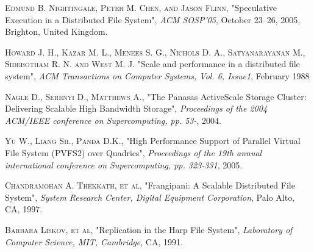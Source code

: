 \documentclass[a4paper,12pt]{article}
\begin{document}
\begin{thebibliography}{99}
  \textsc{Edmund B. Nightingale, Peter M. Chen, and Jason
Flinn},
  "Speculative Execution in a Distributed File System",
  \emph{ACM SOSP’05},
  October 23–26, 2005, Brighton, United Kingdom.

  \textsc{Howard J. H., Kazar M. L., Menees S. G., Nichols D. A.,
Satyanarayanan M., Sidebotham R. N. and West M. J.}
  "Scale and performance in a distributed file system",
  \emph{ACM Transactions on Computer Systems, Vol. 6, Issue1},
  February 1988

  \textsc{Nagle D., Serenyi D., Matthews A.},
  "The Panasas ActiveScale Storage Cluster: Delivering Scalable High Bandwidth Storage",
  \emph{Proceedings of the 2004 ACM/IEEE conference on Supercomputing, pp. 53-},
  2004.

  \textsc{Yu W., Liang Sh., Panda D.K.},
  "High Performance Support of Parallel Virtual File System (PVFS2) over Quadrics",
  \emph{Proceedings of the 19th annual international conference on Supercomputing, pp. 323-331},
  2005.

  \textsc{Chandramohan A. Thekkath, et al},
  "Frangipani: A Scalable Distributed File System",
  \emph{System Research Center, Digital Equipment Corporation},
  Palo Alto, CA, 1997.

  \textsc{Barbara Liskov, et al},
  "Replication in the Harp File System",
  \emph{Laboratory of Computer Science, MIT, Cambridge},
  CA, 1991.
\end{thebibliography}
\end{document}
